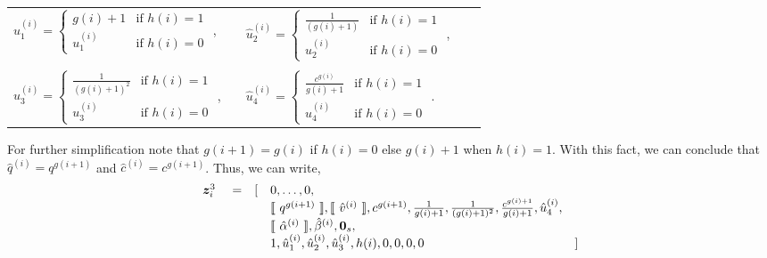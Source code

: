 \begin{table}[ht]
    \small
    \hspace*{12mm}
    \begin{tabular}{lclcl}
    $
    \hat{u}_1^{(i)} = 
    \begin{cases} 
    g(i)+1 & \text{if }h(i)=1 \\
    u_1^{(i)} & \text{if }h(i)=0
    \end{cases} 
    $ ,
    &&
    $
    \hat{u}_2^{(i)} = 
    \begin{cases} 
    \frac{1}{(g(i)+1)} & \text{if }h(i)=1 \\
    u_2^{(i)} & \text{if }h(i)=0
    \end{cases}  
    $ ,
    \\\\
    $
    \hat{u}_3^{(i)} = 
    \begin{cases} 
    \frac{1}{(g(i)+1)^2} & \text{if }h(i)=1 \\
    u_3^{(i)} & \text{if }h(i)=0
    \end{cases} 
    $ ,
    &&
    $
    \hat{u}_4^{(i)} = 
    \begin{cases} 
    \frac{c^{g(i)}}{g(i)+1} & \text{if }h(i)=1 \\
    u_4^{(i)} & \text{if }h(i)=0
    \end{cases} 
    $ .
    \end{tabular}
\end{table}

For further simplification note that $g(i+1) = g(i) $ if $h(i) = 0$ else $ g(i) + 1$ when $h(i) = 1$. With this fact, we can conclude that $\hat{q}^{(i)}=q^{g(i+1)}$ and $\hat{c}^{(i)}=c^{g(i+1)}$. Thus, we can write,
\begin{equation*}
\begin{array}{rcllr}
{\bm{z}}^3_i \ & = & [ 
& 0,\ldots,0, \\
&&& \llbracket\ {q}^{g(i+1)}\ \rrbracket,\llbracket\ \hat{v}^{(i)}\ \rrbracket,{c}^{g(i+1)},\frac{1}{g(i)+1},\frac{1}{(g(i)+1)^2},\frac{c^{g(i)+1}}{g(i)+1},\hat{u}_4^{(i)}, \\
&&& \llbracket\ \hat{\alpha}^{(i)}\ \rrbracket,\hat{\beta}^{(i)},{\bm{0}}_s, \\
&&& 1,\hat{u}_1^{(i)},\hat{u}_2^{(i)},\hat{u}_3^{(i)},h(i),0,0,0,0 & ] 
\end{array}
\end{equation*}



